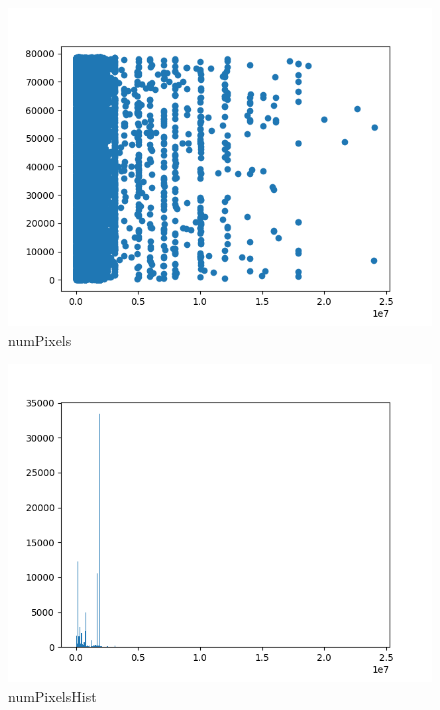 \begin{figure}
	\includegraphics[width=\textwidth]{images/numPixels}
	\caption{numPixels}
	\label{numPixels}
\end{figure}

\begin{figure}
	\includegraphics[width=\textwidth]{images/numPixelsHist}
	\caption{numPixelsHist}
	\label{numPixelsHist}
\end{figure}

